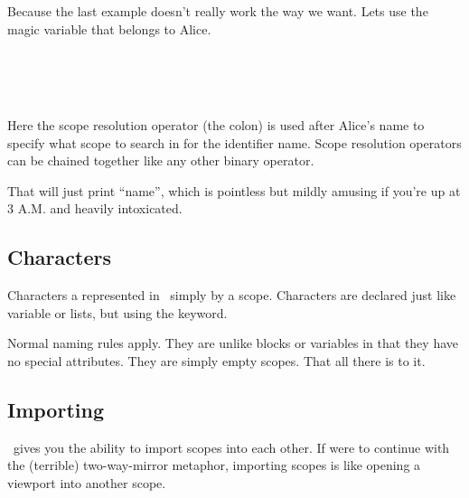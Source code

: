 Because the last example doesn't really work the way we want.  Lets use the  magic variable that belongs to Alice.

\begin{SSCodeBox}
\scitea{\{} \\
\scitea{\hspace*{4em}}
\scitea{ =} \\
\scitea{\hspace*{4em}}
\scitea{;} \\
\scitea{\}}
\end{SSCodeBox}

Here the scope resolution operator (the colon) is used after Alice's name to specify what scope to search in for the identifier name.  Scope resolution operators can be chained together like any other binary operator.

\begin{SSCodeBox}
\end{SSCodeBox}

That will just print ``name'', which is pointless but mildly amusing if you're up at 3 A.M. and heavily intoxicated.

\subsection{Characters}

Characters a represented in \SSquared\ simply by a scope.  Characters are declared just like variable or lists, but using the  keyword.

\begin{SSCodeBox}
\end{SSCodeBox}

Normal naming rules apply. They are unlike blocks or variables in that they have no special attributes.  They are simply empty scopes.  That all there is to it.

\subsection{Importing}

\SSquared\ gives you the ability to import scopes into each other.  If were to continue with the (terrible) two-way-mirror metaphor, importing scopes is like opening a viewport into another scope.

